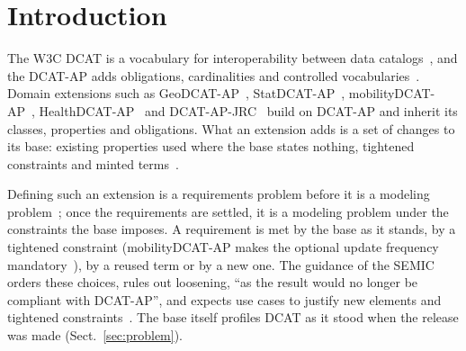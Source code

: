 \acresetall
\section{Introduction}\label{sec:intro}

The W3C \ac{DCAT} is a vocabulary for interoperability between data catalogs~\cite{w3cdcat3}, and the
\ac{DCAT-AP} adds obligations, cardinalities and controlled vocabularies~\cite{semicdcatap}. Domain extensions
such as GeoDCAT-AP~\cite{geodcatap10}, StatDCAT-AP~\cite{statdcatap}, mobilityDCAT-AP~\cite{scrocca2025mobilitydcat},
HealthDCAT-AP~\cite{derycke2025healthdcat} and DCAT-AP-JRC~\cite{perego2016jrc} build on \acs{DCAT-AP} and
inherit its classes, properties and obligations. What an extension adds is a set of changes to its base: existing
properties used where the base states nothing, tightened constraints and minted terms~\cite{semicreuse2026}.

Defining such an extension is a requirements problem before it is a modeling problem~\cite{anon2027rq1}; once
the requirements are settled, it is a modeling problem under the constraints the base imposes. A requirement is
met by the base as it stands, by a tightened constraint (mobilityDCAT-AP makes the optional update frequency
mandatory~\cite{mobilitydcatspec}), by a reused term or by a new one.
The guidance of the \ac{SEMIC} orders these choices, rules out loosening, ``as the result would no longer be
compliant with DCAT-AP'', and expects use cases to justify new elements and tightened
constraints~\cite{semicreuse2026}.
The base itself profiles DCAT as it stood when the release was made (Sect.~\ref{sec:problem}).

